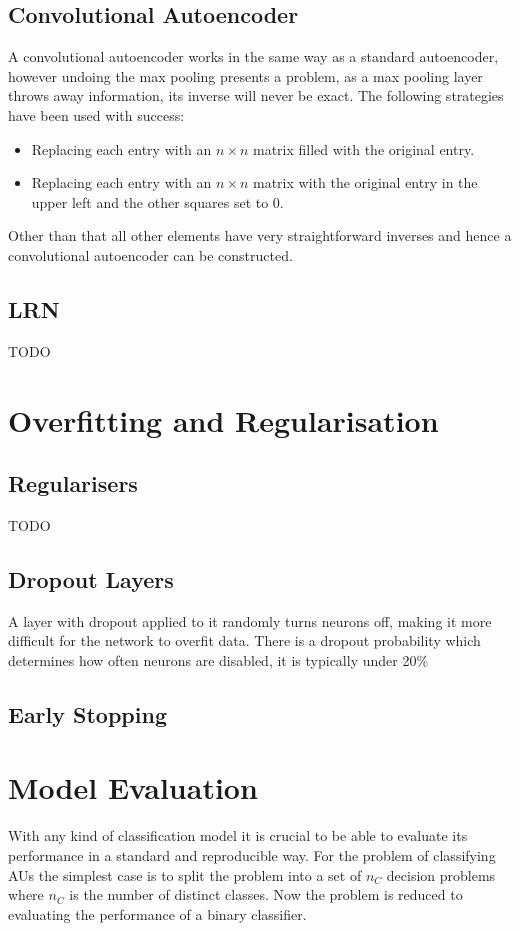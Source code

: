     \subsection{Convolutional Autoencoder}
      A convolutional autoencoder works in the same way as a standard autoencoder, however
      undoing the max pooling presents a problem, as a max pooling layer throws away
      information, its inverse will never be exact. The following strategies have been
      used with success:
      \begin{itemize}
        \item Replacing each entry with an $n \times n$ matrix filled with the original
        entry.
        \item Replacing each entry with an  $n\times n$  matrix with
        the original entry in the upper left and the other squares set to 0. \cite{Dosovitskiy2015}
      \end{itemize}

      Other than that all other elements have very straightforward inverses and hence
      a convolutional autoencoder can be constructed.
    \subsection{LRN} \label{sec:lrn}
      TODO\cite{Krizhevsky2012}
  \section{Overfitting and Regularisation}
    \subsection{Regularisers}
      TODO
    \subsection{Dropout Layers} \label{sec:dropout}
      A layer with dropout applied to it randomly turns neurons off, making it more
      difficult for the network to overfit data. There is a dropout probability
      which determines how often neurons are disabled, it is typically under 20\%
    \subsection{Early Stopping}
  \section{Model Evaluation} \label{sec:eval}
    With any kind of classification model it is crucial to be able to evaluate its
    performance in a standard and reproducible way. For the problem of classifying
    AUs the simplest case is to split the problem into a set of $n_C$ decision problems
    where $n_C$ is the number of distinct classes. Now the problem is reduced to
    evaluating the performance of a binary classifier.

